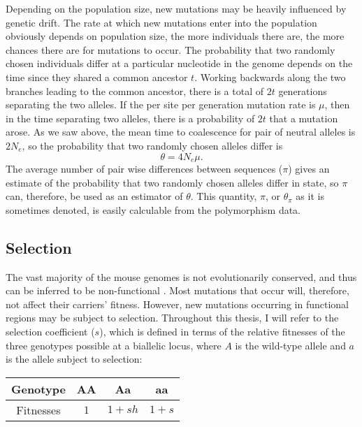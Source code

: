 	Depending on the population size, new mutations may be heavily influenced by genetic drift. The rate at which new mutations enter into the population obviously depends on population size, the more individuals there are, the more chances there are for mutations to occur. The probability that two randomly chosen individuals differ at a particular nucleotide in the genome depends on the time since they shared a common ancestor $t$. Working backwards along the two branches leading to the common ancestor, there is a total of $2t$ generations separating the two alleles. If the per site per generation mutation rate is $\mu$, then in the time separating two alleles, there is a probability of $2t$ that a mutation arose. As we saw above, the mean time to coalescence for pair of neutral alleles is $2N_e$, so the probability that two randomly chosen alleles differ is
	\begin{equation}
	\theta = 4N_e\mu. 		
	\end{equation}
\noindent
The average number of pair wise differences between sequences ($\pi$) gives an estimate of the probability that two randomly chosen alleles differ in state, so $\pi$ can, therefore, be used as an estimator of $\theta$. This quantity, $\pi$, or $\theta_{\pi}$ as it is sometimes denoted, is easily calculable from the polymorphism data. 


\subsection{Selection}

	The vast majority of the mouse genomes is not evolutionarily conserved, and thus can be inferred to be non-functional \citep{RN161}. Most mutations that occur will, therefore, not affect  their carriers' fitness. However, new mutations occurring in functional regions may be subject to selection. Throughout this thesis, I will refer to the selection coefficient ($s$), which is defined in terms of the relative fitnesses of the three genotypes possible at a biallelic locus, where $A$ is the wild-type allele and $a$ is the allele subject to selection:

\begin{center}
\begin{tabular}{c | c | c | c }
	Genotype & AA & Aa & aa \\ \hline
	Fitnesses& $1$ & $1 + sh$ & $1 + s$ \\
\end{tabular}
\end{center}	

